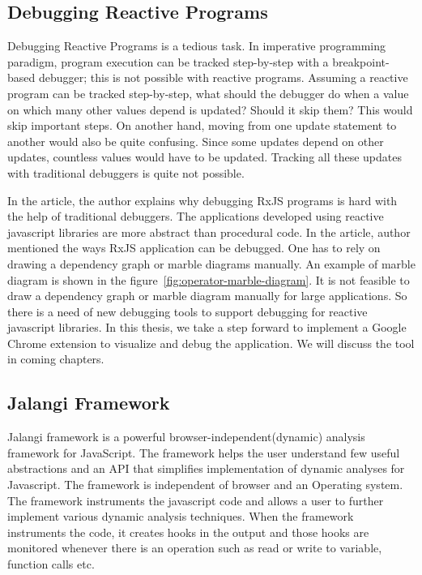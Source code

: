 \subsection{Debugging Reactive Programs}
Debugging Reactive Programs is a tedious task. In imperative programming paradigm, program execution can be tracked step-by-step with a breakpoint-based debugger; this is not possible with reactive programs. Assuming a reactive program can be tracked step-by-step, what should the debugger do when a value on which many other values depend is updated? Should it skip them? This would skip important steps. On another hand, moving from one update statement to another would also be quite confusing. Since some updates depend on other updates, countless values would have to be updated. Tracking all these updates with traditional debuggers is quite not possible.

In the article\cite{debugRxJS}, the author explains why debugging RxJS programs is hard with the help of traditional debuggers. The applications developed using reactive javascript libraries are more abstract than procedural code. In the article, author mentioned the ways RxJS application can be debugged. One has to rely on drawing a dependency graph or marble diagrams manually. An example of marble diagram is shown in the figure~\ref{fig:operator-marble-diagram}. It is not feasible to draw a dependency graph or marble diagram manually for large applications. So there is a need of new debugging tools to support debugging for reactive javascript libraries. In this thesis, we take a step forward to implement a Google Chrome extension to visualize and debug the application. We will discuss the tool in coming chapters.

\subsection{Jalangi Framework}
Jalangi framework\cite{Sen:2013:JSR:2491411.2491447} is a powerful    browser-independent(dynamic) analysis framework for JavaScript. The framework helps the user understand few useful abstractions and an API that simplifies implementation of dynamic analyses for Javascript. The framework is independent of browser and an Operating system. The framework instruments the javascript code and allows a user to further implement various dynamic analysis techniques. When the framework instruments the code, it creates hooks in the output and those hooks are monitored whenever there is an operation such as read or write to variable, function calls etc.


